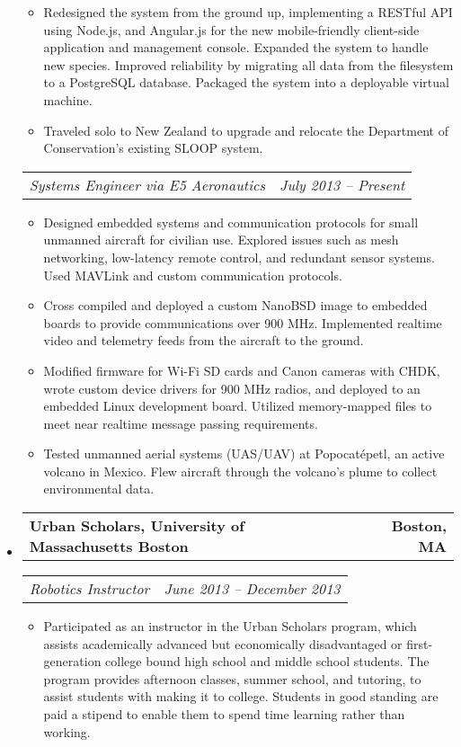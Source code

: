 \documentclass[10pt,letterpaper]{article}
\makeatletter
\newcommand{\headerrow}[2]
{\begin{tabular*}{\linewidth}{l@{\extracolsep{\fill}}r}
	#1 & #2 \\
\end{tabular*}}
\makeatother
\begin{document}
\begin{itemize}
\begin{itemize}
        \item Redesigned the system from the ground up, implementing a RESTful
            API using Node.js, and Angular.js for the new mobile-friendly
            client-side application and management console. Expanded the system
            to handle new species.  Improved reliability by migrating all data
            from the filesystem to a PostgreSQL database.  Packaged the system
            into a deployable virtual machine.

        \item Traveled solo to New Zealand to upgrade and relocate the
            Department of Conservation's existing SLOOP system.

    \end{itemize}

    \headerrow
		{\emph{Systems Engineer via E5 Aeronautics}}
		{\emph{July 2013 -- Present}}
    \begin{itemize}
        \item Designed embedded systems and communication protocols for small
            unmanned aircraft for civilian use.  Explored
            issues such as mesh networking, low-latency remote control, and
            redundant sensor systems.  Used MAVLink and custom communication
            protocols.

        \item Cross compiled and deployed a custom NanoBSD image to embedded
            boards to provide communications over 900 MHz.  Implemented
            realtime video and telemetry feeds from the aircraft to the ground.

        \item Modified firmware for Wi-Fi SD cards and Canon cameras with CHDK,
            wrote custom device drivers for 900 MHz radios, and deployed to an
            embedded Linux development board.  Utilized memory-mapped files to
            meet near realtime message passing requirements.

        \item Tested unmanned aerial systems (UAS/UAV) at Popocatépetl, an active
            volcano in Mexico. Flew aircraft through the volcano's plume to
            collect environmental data.

    \end{itemize}

    \item
    \headerrow
		{\textbf{Urban Scholars, University of Massachusetts Boston}}
		{\textbf{Boston, MA}}
	\headerrow
		{\emph{Robotics Instructor}}
		{\emph{June 2013 -- December 2013}}
	\begin{itemize}
        \item Participated as an instructor in the Urban Scholars program,
            which assists academically advanced but economically disadvantaged
            or first-generation college bound high school and middle school
            students.  The program provides afternoon classes, summer school,
            and tutoring, to assist students with making it to college.
            Students in good standing are paid a stipend to enable them to
            spend time learning rather than working.


\end{itemize}
\end{itemize}
\end{document}
